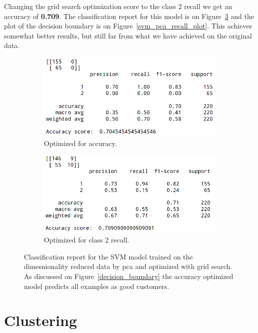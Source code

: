 \documentclass[runningheads]{llncs}
\begin{document}
Changing the grid search optimization score to the class 2 recall we get an accuracy of \textbf{0.709}. The classification report for this model is on Figure~\ref{svm_pca_recall} and the plot of the decision boundary is on Figure~\ref{svm_pca_recall_plot}. This achieves somewhat better results, but still far from what we have achieved on the original data.


\begin{figure}[h]
  \centering
  \begin{subfigure}[b]{0.49\textwidth}
    \includegraphics[width=\textwidth]{images/svm_pca_simple.png}
    \caption{Optimized for accuracy.}
    \label{svm_pca}
  \end{subfigure}
  \hfill
  \begin{subfigure}[b]{0.49\textwidth}
    \includegraphics[width=\textwidth]{images/svm_pca_grid_recall.png}
    \caption{Optimized for class 2 recall.}
    \label{svm_pca_recall}
  \end{subfigure}
  \caption{Classification report for the SVM model trained on the dimesnionality reduced data by pca and optimized with grid search. As discussed on Figure~\ref{decision_boundary} the accuracy optimized model predicts all examples as good customers.}
\end{figure}


\section{Clustering}
\end{document}
